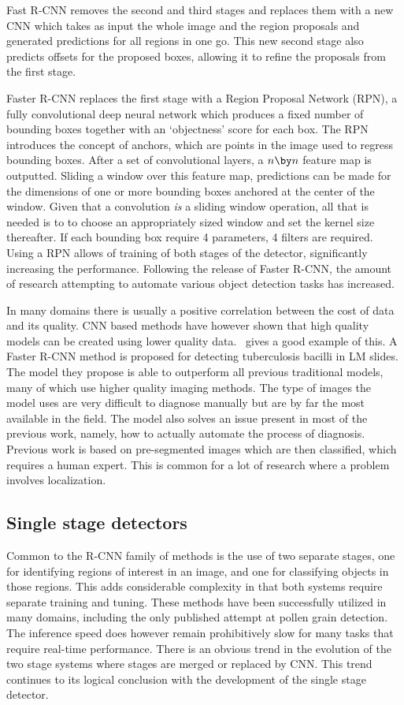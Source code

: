 Fast R-CNN removes the second and third stages and replaces them with a new CNN which takes as input the whole image and the region proposals and generated predictions for all regions in one go.
This new second stage also predicts offsets for the proposed boxes, allowing it to refine the proposals from the first stage.

Faster R-CNN replaces the first stage with a Region Proposal Network (RPN), a fully convolutional deep neural network which produces a fixed number of bounding boxes together with an `objectness' score for each box.
The RPN introduces the concept of anchors, which are points in the image used to regress bounding boxes.
After a set of convolutional layers, a \(n\by n\) feature map is outputted.
Sliding a window over this feature map, predictions can be made for the dimensions of one or more bounding boxes anchored at the center of the window.
Given that a convolution \textit{is} a sliding window operation, all that is needed is to to choose an appropriately sized window and set the kernel size thereafter.
If each bounding box require 4 parameters, 4 filters are required. 
Using a RPN allows of training of both stages of the detector, significantly increasing the performance.
Following the release of Faster R-CNN, the amount of research attempting to automate various object detection tasks has increased. 

In many domains there is usually a positive correlation between the cost of data and its quality.
CNN based methods have however shown that high quality models can be created using lower quality data.\ \textcite{el_melegy_automatic_2019} gives a good example of this.
A Faster R-CNN method is proposed for detecting tuberculosis bacilli in LM slides.
The model they propose is able to outperform all previous traditional models, many of which use higher quality imaging methods.
The type of images the model uses are very difficult to diagnose manually but are by far the most available in the field.
The model also solves an issue present in most of the previous work, namely, how to actually automate the process of diagnosis.
Previous work is based on pre-segmented images which are then classified, which requires a human expert.
This is common for a lot of research where a problem involves localization. 

\subsection{Single stage detectors}\label{sec:ssd}
Common to the R-CNN family of methods is the use of two separate stages, one for identifying regions of interest in an image, and one for classifying objects in those regions.
This adds considerable complexity in that both systems require separate training and tuning.
These methods have been successfully utilized in many domains, including the only published attempt at pollen grain detection.
The inference speed does however remain prohibitively slow for many tasks that require real-time performance.
There is an obvious trend in the evolution of the two stage systems where stages are merged or replaced by CNN\@.
This trend continues to its logical conclusion with the development of the single stage detector.

